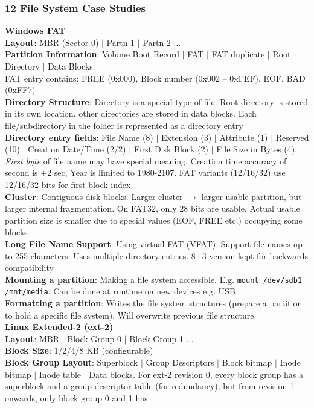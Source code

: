 \documentclass{article}
\begin{document}
{\begin{multicols*}{3}
\subsubsection*{\underline{12 File System Case Studies}}
\textbf{Windows FAT}\\
\textbf{Layout}: MBR (Sector 0) $|$ Partn 1 $|$ Partn 2 $\dots$\\
\textbf{Partition Information}: Volume Boot Record $|$ FAT $|$ FAT duplicate $|$ Root Directory $|$ Data Blocks \\
FAT entry contains: FREE (0x000), Block number (0x002 – 0xFEF), EOF, BAD (0xFF7)\\
\textbf{Directory Structure}: Directory is a special type of file. Root directory is stored in its own location, other directories are stored in data blocks. Each file/subdirectory in the folder is represented as a directory entry \\
\textbf{Directory entry fields}: File Name (8) $|$ Extension (3) $|$ Attribute (1) $|$ Reserved (10) $|$ Creation Date/Time (2/2) $|$ First Disk Block (2) $|$ File Size in Bytes (4). \textit{First byte} of file name may have special meaning. Creation time accuracy of second is $\pm$2 sec, Year is limited to 1980-2107. FAT variants (12/16/32) use 12/16/32 bits for first block index \\
\textbf{Cluster}: Contiguous disk blocks. Larger cluster $\to$ larger usable partition, but larger internal fragmentation. On FAT32, only 28 bits are usable. Actual usable partition size is smaller due to special values (EOF, FREE etc.) occupying some blocks  \\
\textbf{Long File Name Support}: Using virtual FAT (VFAT). Support file names up to 255 characters. Uses multiple directory entries. 8+3 version kept for backwards compatibility \\
\textbf{Mounting a partition}: Making a file system accessible. E.g. \texttt{mount /dev/sdb1 /mnt/media}. Can be done at runtime on new devices e.g. USB \\
\textbf{Formatting a partition}: Writes the file system structures (prepare a partition to hold a specific file system). Will overwrite previous file structure. \\
\textbf{Linux Extended-2 (ext-2)}\\
\textbf{Layout}: MBR $|$ Block Group 0 $|$ Block Group 1 $\dots$ \\
\textbf{Block Size}: 1/2/4/8 KB (configurable)\\
\textbf{Block Group Layout}: Superblock $|$ Group Descriptors $|$ Block bitmap $|$ Inode bitmap $|$ Inode table $|$ Data blocks. For ext-2 revision 0, every block group has a superblock and a group descriptor table (for redundancy), but from revision 1 onwards, only block group 0 and 1 has \\

\end{multicols*}}
\end{document}
